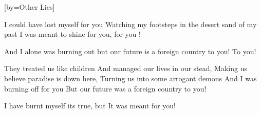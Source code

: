 [by={Other Lies}]

  \chordsoff
  \beginverse
  I could have lost myself for you 
  Watching my footsteps in the desert sand of my past
  I was meant to shine for you, for you !
  \endverse

  \beginchorus
  And I alone was burning out but our future is a foreign country to you! To you!
  \endchorus

  \beginverse  
  They treated us like children
  And managed our lives in our stead, 
  Making us believe paradise is down here,
  Turning us into some arrogant demons  
  And I was burning off for you
  But our future was a foreign country to you! 
  \endverse


  \beginchorus
  I have burnt myself its true, but It  was meant for you!
  \endchorus
\endsong

